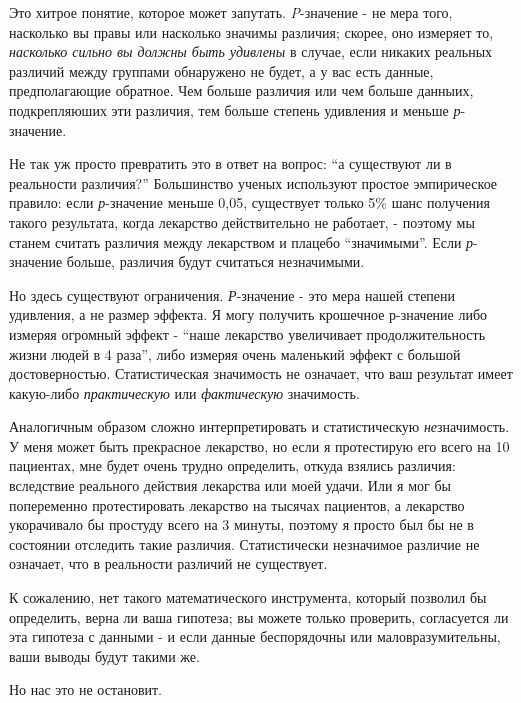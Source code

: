 Это хитрое понятие, которое может запутать. \emph{P}-значение - не мера того, насколько вы правы или насколько значимы различия; скорее, оно измеряет то, \emph{насколько сильно вы должны быть удивлены} в случае, если никаких реальных различий между группами обнаружено не будет, а у вас есть данные, предполагающие обратное. Чем больше различия или чем больше данныих, подкрепляюших эти различия, тем больше степень удивления и меньше \emph{р}-значение.

Не так уж просто превратить это в ответ на вопрос: “а существуют ли в реальности различия?” Большинство ученых используют простое эмпирическое правило: если \emph{р}-значение меньше 0,05, существует только 5\% шанс получения такого результата, когда лекарство действительно не работает, - поэтому мы станем считать различия между лекарством и плацебо ``значимыми''. Если \emph{р}-значение больше, различия будут считаться незначимыми.

Но здесь существуют ограничения. \emph{Р}-значение - это мера нашей степени удивления, а не размер эффекта. Я могу получить крошечное р-значение либо измеряя огромный эффект - ``наше лекарство увеличивает продолжительность жизни людей в 4 раза'', либо измеряя очень маленький эффект с большой достоверностью. Статистическая значимость не означает, что ваш результат имеет какую-либо \emph{практическую} или \emph{фактическую} значимость.

Аналогичным образом сложно интерпретировать и статистическую \emph{не}значимость. У меня может быть прекрасное лекарство, но если я протестирую его всего на 10 пациентах, мне будет очень трудно определить, откуда взялись различия: вследствие реального действия лекарства или моей удачи. Или я мог бы попеременно протестировать лекарство на тысячах пациентов, а лекарство укорачивало бы простуду всего на 3 минуты, поэтому я просто был бы не в состоянии отследить такие различия. Статистически незначимое различие не означает, что в реальности различий не существует.

К сожалению, нет такого математического инструмента, который позволил бы определить, верна ли ваша гипотеза; вы можете только проверить, согласуется ли эта гипотеза с данными - и если данные беспорядочны или маловразумительны, ваши выводы будут такими же. 

Но нас это не остановит.